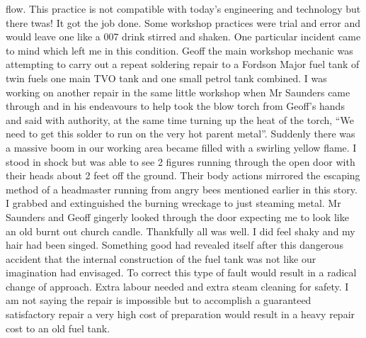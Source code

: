 flow.  This practice is not compatible with today's engineering and technology
but there twas!  It got the job done. Some workshop practices were trial and
error and would leave one like a 007 drink stirred and shaken. One particular
incident came to mind which left me in this condition.  Geoff the main workshop
mechanic was attempting to carry out a repeat soldering repair to a Fordson
Major fuel tank of twin fuels one main TVO tank and one small petrol tank
combined.  I was working on another repair in the same little workshop when Mr
Saunders came through and in his endeavours to help took the blow torch from
Geoff's hands and said with authority, at the same time turning up the heat of
the torch,  ``We need to get this solder to run on the very hot parent metal''.
Suddenly there was a massive boom in our working area became filled with a
swirling yellow flame.  I stood in shock but was able to see 2 figures running
through the open door with their heads about 2 feet off the ground.  Their body
actions mirrored the escaping method of a headmaster running from angry bees
mentioned earlier in this story.  I grabbed and extinguished the burning
wreckage to just steaming metal.  Mr Saunders and Geoff gingerly looked through
the door expecting me to look like an old burnt out church candle.  Thankfully
all was well.  I did feel shaky and my hair had been singed.  Something good
had revealed itself after this dangerous accident that the internal
construction of the fuel tank was not like our imagination had envisaged.  To
correct this type of fault would result in a radical change of approach.  Extra
labour needed and extra steam cleaning for safety. I am not saying the repair
is impossible but to accomplish a guaranteed satisfactory repair a very high
cost of preparation would result in a heavy repair cost to an old fuel tank.
